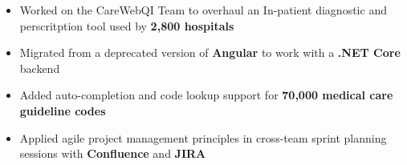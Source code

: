 \begin{itemize}
    \item Worked on the CareWebQI Team to overhaul an In-patient diagnostic and perscritption tool used by \textbf{2,800 hospitals}
    \item Migrated from a deprecated version of \textbf{Angular} to work with a \textbf{.NET Core} backend
    \item Added auto-completion and code lookup support for \textbf{70,000 medical care guideline codes}
    \item Applied agile project management principles in cross-team sprint planning sessions with \textbf{Confluence} and \textbf{JIRA}
\end{itemize}
